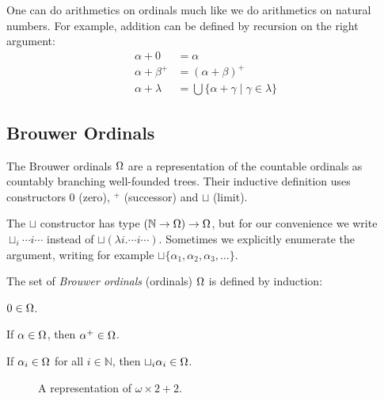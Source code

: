 One can do arithmetics on ordinals much like we do arithmetics on natural
numbers. For example, addition can be defined by recursion on the right
argument:
\begin{align*}
  \alpha + 0       &= \alpha\\
  \alpha + \beta^+ &= (\alpha + \beta)^+\\
  \alpha + \lambda &= \bigcup \{ \alpha + \gamma \; | \; \gamma \in \lambda \}
\end{align*}


\subsection{Brouwer Ordinals}\label{sub:brouwer}



The Brouwer ordinals $\Ord$ are a representation of the countable ordinals as
countably branching well-founded trees. Their inductive definition
uses constructors $0$ (zero), $^+$ (successor) and $\sqcup$ (limit).

The $\sqcup$ constructor has type $(\mathbb{N} \rightarrow \Ord) \rightarrow
\Ord$, but for our convenience we write $\sqcup_i \cdots i \cdots$ instead
of $\sqcup (\lambda i . \cdots i \cdots)$. Sometimes we explicitly enumerate
the argument, writing for example $\sqcup \{ \alpha_1, \alpha_2,
\alpha_3, \ldots \}$.

\begin{definition}\label{def:ordinals}%
The set of \emph{Brouwer ordinals} (ordinals) $\Ord$ is defined by
induction:
\begin{compactenum}
  \item
    $0 \in \Ord$.
  \item
    If $\alpha \in \Ord$, then $\alpha^+ \in \Ord$.
  \item
    If $\alpha_i \in \Ord$ for all $i \in \mathbb{N}$, then $\sqcup_i
    \alpha_i \in \Ord$.
\end{compactenum}
\end{definition}

\begin{figure}
\begin{center}
\begin{tikzpicture}

\end{tikzpicture}
\end{center}
\caption{A representation of $\omega \times 2 + 2$.}\label{fig:brouwer}
\end{figure}

